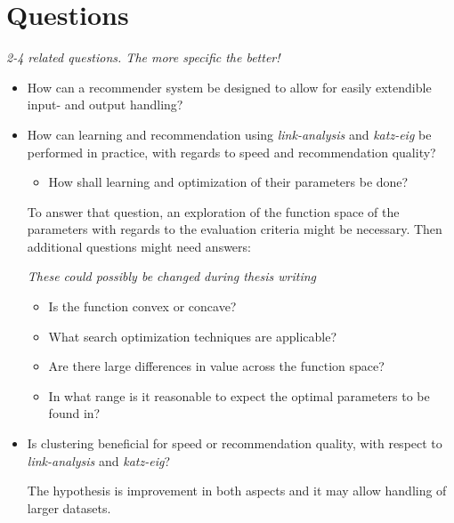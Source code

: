 
\section{Questions}\label{sec:intro:questions}

\textit{2-4 related questions. The more specific the better!}

\begin{itemize}

    \item How can a recommender system be designed to allow for easily extendible input- and output handling?


    \item How can learning and recommendation using \textit{link-analysis} and \textit{katz-eig} be performed in practice, with regards to speed and recommendation quality?

        \begin{itemize}
            \item How shall learning and optimization of their parameters be done?
        \end{itemize}

        To answer that question, an exploration of the function space of the parameters with regards to the evaluation criteria might be necessary. Then additional questions might need answers:

        \textit{These could possibly be changed during thesis writing}

        \begin{itemize}
            \item Is the function convex or concave?
            \item What search optimization techniques are applicable?
            \item Are there large differences in value across the function space?
            \item In what range is it reasonable to expect the optimal parameters to be found in?
        \end{itemize}



    \item Is clustering beneficial for speed or recommendation quality, with respect to \textit{link-analysis} and \textit{katz-eig}?

        The hypothesis is improvement in both aspects and it may allow handling of larger datasets.


\end{itemize}
